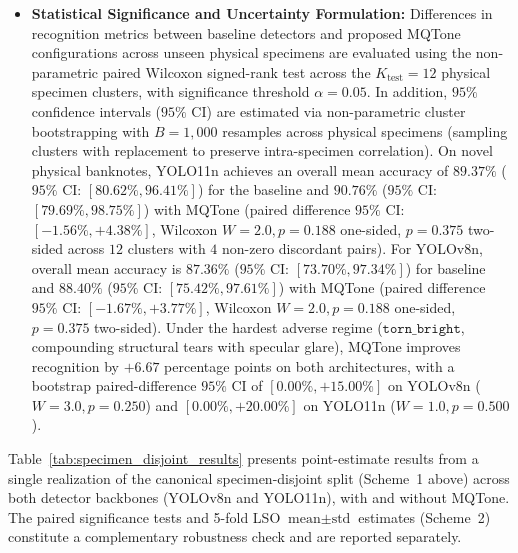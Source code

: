 \documentclass[final,5p,times,twocolumn,authoryear]{elsarticle}
\begin{document}
\begin{itemize}
\begin{equation}
    \end{equation}
    quantifying localized defect localization degradation induced by specular reflections on unseen physical banknote surfaces.
    \item \textbf{Statistical Significance and Uncertainty Formulation:} Differences in recognition metrics between baseline detectors and proposed MQTone configurations across unseen physical specimens are evaluated using the non-parametric paired Wilcoxon signed-rank test across the $K_{\text{test}} = 12$ physical specimen clusters, with significance threshold $\alpha = 0.05$. In addition, $95\%$ confidence intervals ($95\%$ CI) are estimated via non-parametric cluster bootstrapping with $B = 1{,}000$ resamples across physical specimens (sampling clusters with replacement to preserve intra-specimen correlation). On novel physical banknotes, YOLO11n achieves an overall mean accuracy of $89.37\%$ ($95\%$ CI: $[80.62\%, 96.41\%]$) for the baseline and $90.76\%$ ($95\%$ CI: $[79.69\%, 98.75\%]$) with MQTone (paired difference $95\%$ CI: $[-1.56\%, +4.38\%]$, Wilcoxon $W = 2.0, p = 0.188$ one-sided, $p = 0.375$ two-sided across $12$ clusters with $4$ non-zero discordant pairs). For YOLOv8n, overall mean accuracy is $87.36\%$ ($95\%$ CI: $[73.70\%, 97.34\%]$) for baseline and $88.40\%$ ($95\%$ CI: $\mathbf{[75.42\%, 97.61\%]}$) with MQTone (paired difference $95\%$ CI: $\mathbf{[-1.67\%, +3.77\%]}$, Wilcoxon $W = \mathbf{2.0}, p = \mathbf{0.188}$ one-sided, $p = \mathbf{0.375}$ two-sided). Under the hardest adverse regime ($\texttt{torn\_bright}$, compounding structural tears with specular glare), MQTone improves recognition by $+6.67$ percentage points on both architectures, with a bootstrap paired-difference $95\%$ CI of $[0.00\%, +15.00\%]$ on YOLOv8n ($W = 3.0, p = 0.250$) and $[0.00\%, +20.00\%]$ on YOLO11n ($W = 1.0, p = 0.500$).
\end{itemize}

Table~\ref{tab:specimen_disjoint_results} presents point-estimate results from a single realization of the canonical specimen-disjoint split (Scheme~1 above) across both detector backbones (YOLOv8n and YOLO11n), with and without MQTone. The paired significance tests and 5-fold LSO $\text{mean} \pm \text{std}$ estimates (Scheme~2) constitute a complementary robustness check and are reported separately.
\end{document}
